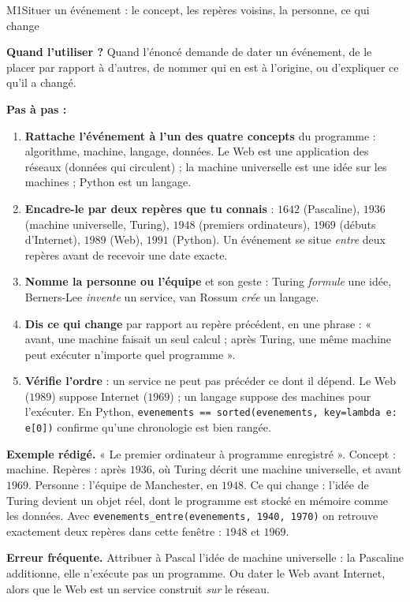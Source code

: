 \begin{fichemethode}{M1}{Situer un événement : le concept, les repères voisins, la personne, ce qui change}

\textbf{Quand l'utiliser ?} Quand l'énoncé demande de dater un événement, de le placer par
rapport à d'autres, de nommer qui en est à l'origine, ou d'expliquer ce qu'il a changé.

\textbf{Pas à pas :}
\begin{enumerate}
  \item \textbf{Rattache l'événement à l'un des quatre concepts} du programme : algorithme,
        machine, langage, données. Le Web est une application des réseaux (données qui
        circulent) ; la machine universelle est une idée sur les machines ; Python est un
        langage.
  \item \textbf{Encadre-le par deux repères que tu connais} : $1642$ (Pascaline), $1936$
        (machine universelle, Turing), $1948$ (premiers ordinateurs), $1969$ (débuts
        d'Internet), $1989$ (Web), $1991$ (Python). Un événement se situe \emph{entre} deux
        repères avant de recevoir une date exacte.
  \item \textbf{Nomme la personne ou l'équipe} et son geste : Turing \emph{formule} une idée,
        Berners-Lee \emph{invente} un service, van Rossum \emph{crée} un langage.
  \item \textbf{Dis ce qui change} par rapport au repère précédent, en une phrase : « avant,
        une machine faisait un seul calcul ; après Turing, une même machine peut exécuter
        n'importe quel programme ».
  \item \textbf{Vérifie l'ordre} : un service ne peut pas précéder ce dont il dépend. Le Web
        ($1989$) suppose Internet ($1969$) ; un langage suppose des machines pour l'exécuter.
        En Python, \lstinline{evenements == sorted(evenements, key=lambda e: e[0])} confirme
        qu'une chronologie est bien rangée.
\end{enumerate}

\textbf{Exemple rédigé.} « Le premier ordinateur à programme enregistré ». Concept :
machine. Repères : après $1936$, où Turing décrit une machine universelle, et avant $1969$.
Personne : l'équipe de Manchester, en $1948$. Ce qui change : l'idée de Turing devient un
objet réel, dont le programme est stocké en mémoire comme les données. Avec
\lstinline{evenements_entre(evenements, 1940, 1970)} on retrouve exactement deux repères
dans cette fenêtre : $1948$ et $1969$.

\textbf{Erreur fréquente.} Attribuer à Pascal l'idée de machine universelle : la Pascaline
additionne, elle n'exécute pas un programme. Ou dater le Web avant Internet, alors que le
Web est un service construit \emph{sur} le réseau.

\end{fichemethode}
